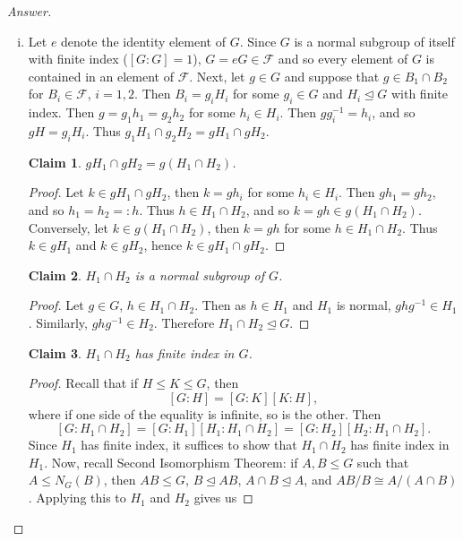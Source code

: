 \documentclass[12pt]{article}
\newcommand\inv[1]{#1^{-1}}
\newcommand\paren[1]{\left( #1 \right)}
\newcommand{\sqbrack}[1]{\left [ #1 \right ]}
\newtheorem*{claim}{Claim}
\theoremstyle{definition}
\begin{document}
\begin{proof}[Answer]
    \noindent
    \begin{enumerate}[(i)]
        \item Let $e$ denote the identity element of $G$. Since $G$ is a normal subgroup of itself with finite index ($[G:G] = 1$), $G = eG \in \mathcal{F}$ and so every element of $G$ is contained in an element of $\mathcal{F}$. Next, let $g \in G$ and suppose that $g \in B_1 \cap B_2$ for  $B_i \in \mathcal{F}$, $i = 1,2$. Then $B_i = g_i H_i$ for some $g_i \in G$ and $H_i \trianglelefteq G$ with finite index. Then $g = g_1 h_1 = g_2 h_2$ for some $h_i \in H_i$. Then $g \inv{g_i} = h_i$, and so $gH = g_i H_i$. Thus $g_1 H_1 \cap g_2 H_2 = g H_1 \cap g H_2$. 
        \begin{claim}
            $g H_1 \cap g H_2 = g \paren{ H_1 \cap H_2 }$. 
        \end{claim}
        \begin{proof}
            Let $k \in g H_1 \cap g H_2$, then $k = g h_i$ for some $h_i \in H_i$. Then $g h_1 = g h_2$, and so $h_1 = h_2 =: h$. Thus $h \in H_1 \cap H_2$, and so $k = g h \in g \paren{ H_1 \cap H_2 }$. Conversely, let $k \in g \paren{ H_1 \cap H_2 }$, then $k = g h$ for some $h \in H_1 \cap H_2$. Thus $k \in g H_1$ and $k \in g H_2$, hence $k \in g H_1 \cap g H_2$. 
        \end{proof}
        \begin{claim}
            $H_1 \cap H_2$ is a normal subgroup of $G$.
        \end{claim}
        \begin{proof}
            Let $g \in G$, $h \in H_1 \cap H_2$. Then as $h \in H_1$ and $H_1$ is normal, $g h \inv{g} \in H_1$. Similarly, $g h \inv{g} \in H_2$. Therefore $H_1 \cap H_2 \trianglelefteq G$.
        \end{proof}
        \begin{claim}
            $H_1 \cap H_2$ has finite index in $G$.
        \end{claim}
        \begin{proof}
            Recall that if $H \leq K \leq G$, then 
            \[
                \sqbrack{ G : H } = \sqbrack{ G : K } \sqbrack{ K : H },
            \]
            where if one side of the equality is infinite, so is the other. Then 
            \[
                \sqbrack{ G : H_1 \cap H_2 } = \sqbrack{ G : H_1 } \sqbrack{ H_1 : H_1 \cap H_2 } = \sqbrack{ G : H_2 } \sqbrack{ H_2 : H_1 \cap H_2 }.
            \]
            Since $H_1$ has finite index, it suffices to show that $H_1 \cap H_2$ has finite index in $H_1$. Now, recall Second Isomorphism Theorem: if $A , B \leq G$ such that $A \leq N_G(B)$, then $AB \leq G$, $B \trianglelefteq AB$, $A \cap B \trianglelefteq A$, and $AB / B \cong A / \paren{ A \cap B }$. Applying this to $H_1$ and $H_2$ gives us 

\end{proof}
\end{enumerate}
\end{proof}
\end{document}

